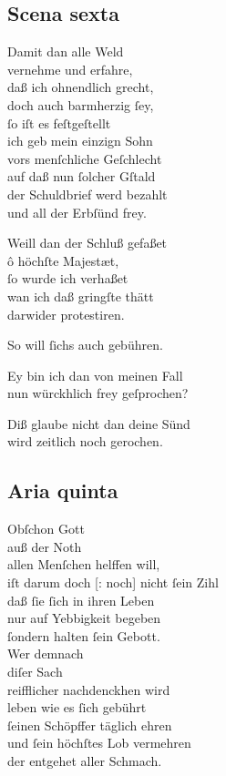 \documentclass{ees}
\newenvironment{lyrics}[1]{%
  \subsection{#1}\nopagebreak%
  \begin{lyricslist}%
  \let\voice\item%
}{%
  \end{lyricslist}%
}
\begin{document}
\begin{lyrics}{Scena sexta}
  \voice[Schöpffer]
  Damit dan alle Weld\\
  vernehme und erfahre,\\
  daß ich ohnendlich grecht,\\
  doch auch barmherzig ſey,\\
  ſo iſt es feſtgeſtellt\\
  ich geb mein einzign Sohn\\
  vors menſchliche Geſchlecht\\
  auf daß nun ſolcher Gſtald\\
  der Schuldbrief werd bezahlt\\
  und all der Erbſünd frey.

  \voice[Gerecht.]
  Weill dan der Schluß gefaßet\\
  ô höchſte Majestæt,\\
  ſo wurde ich verhaßet\\
  wan ich daß gringſte thätt\\
  darwider protestiren.

  \voice[Barmh.]
  So will ſichs auch gebühren.

  \voice[Adam]
  Ey bin ich dan von meinen Fall\\
  nun würckhlich frey geſprochen?

  \voice[Gerecht.]
  Diß glaube nicht dan deine Sünd\\
  wird zeitlich noch gerochen.
\end{lyrics}

\begin{lyrics}{Aria quinta}
  \voice[Gerecht.]
  Obſchon Gott\\
  auß der Noth\\
  allen Menſchen helffen will,\\
  iſt darum doch [: noch] nicht ſein Zihl\\
  daß ſie ſich in ihren Leben\\
  nur auf Yebbigkeit begeben\\
  ſondern halten ſein Gebott.\\[1ex]
  Wer demnach\\
  diſer Sach\\
  reifflicher nachdenckhen wird\\
  leben wie es ſich gebührt\\
  ſeinen Schöpffer täglich ehren\\
  und ſein höchſtes Lob vermehren\\
  der entgehet aller Schmach.
\end{lyrics}
\end{document}
